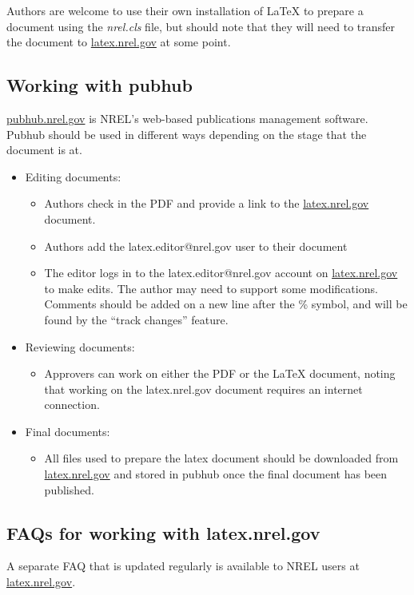 Authors are welcome to use their own installation of LaTeX to prepare a document using the \emph{nrel.cls} file, but should note that they will need to transfer the document to \href{latex.nrel.gov}{latex.nrel.gov} at some point.

\subsection{Working with pubhub}
\href{pubhub.nrel.gov}{pubhub.nrel.gov} is NREL's web-based publications management software. Pubhub should be used in different ways depending on the stage that the document is at.
\begin{itemize}
\item Editing documents: 
\begin{itemize} 
\item Authors check in the PDF and provide a link to the \href{latex.nrel.gov}{latex.nrel.gov} document.
\item Authors add the latex.editor@nrel.gov user to their document
\item The editor logs in to the latex.editor@nrel.gov account on \href{latex.nrel.gov}{latex.nrel.gov} to make edits. The author may need to support some modifications. Comments should be added on a new line after the \% symbol, and will be found by the ``track changes'' feature.
\end{itemize}
\item Reviewing documents:
\begin{itemize} 
\item Approvers can work on either the PDF or the LaTeX document, noting that working on the  latex.nrel.gov document requires an internet connection.
\end{itemize}
\item Final documents: 
\begin{itemize} 
\item All files used to prepare the latex document should be downloaded from \href{latex.nrel.gov}{latex.nrel.gov} and stored in pubhub once the final document has been published.
\end{itemize}
\end{itemize}

\subsection{FAQs for working with latex.nrel.gov}
A separate FAQ that is updated regularly is available to NREL users at \href{latex.nrel.gov}{latex.nrel.gov}.

